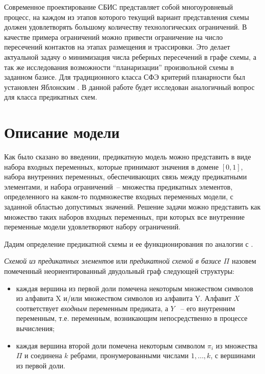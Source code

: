 \documentclass[12pt]{extarticle}
\newenvironment{definition}[1][Определение.]{\begin{trivlist}
\item[\hskip \labelsep {\bfseries #1}]}{\end{trivlist}}
\begin{document}
Современное проектирование СБИС представляет собой многоуровневый процесс, на каждом из этапов которого
текущий вариант представления схемы должен удовлетворять большому количеству технологических ограничений. 
В качестве примера ограничений можно привести ограничение на число пересечений контактов на этапах размещения и трассировки.
Это делает актуальной задачу о минимизация числа реберных пересечений в графе схемы, а так же исследования
возможности ``планаризации'' произвольной схемы в заданном базисе. Для традиционного класса СФЭ критерий планарности
был установлен Яблонским \cite{yabl_planar}. В данной работе будет исследован аналогичный вопрос для класса предикатных схем.

\clearpage
\section{Описание модели}

Как было сказано во введении, предикатную модель можно представить в виде набора входных переменных,
которые принимают значения в домене $[0, 1]$, набора внутренних переменных, 
обеспечивающих связь между предикатными элементами, и набора ограничений~-- множества
предикатных элементов, определенного на каком-то подмножестве входных переменных модели, 
с заданной областью допустимых значений.
Решение задачи можно представить как множество таких наборов входных переменных, при которых все внутренние
переменные модели удовлетворяют набору ограничений.

Дадим определение предикатной схемы и ее функционирования по аналогии с \cite{Shu11}.

\begin{definition}
\label{pred_def}
\textit{Схемой из предикатных элементов} или \textit{предикатной схемой в базисе $\Pi$} назовем помеченный
неориентированный двудольный граф следующей структуры:

\begin{itemize}
\item каждая вершина из первой доли помечена некоторым множеством символов из алфавита X и/или 
множеством символов из алфавита Y. 
Алфавит $X$ соответствует \textit{входным} переменным предиката, а $Y$ ~-- его внутренним переменным, 
т.е. переменным, возникающим непосредственно в процессе вычисления; 

\item каждая вершина второй доли помечена некоторым символом $\pi_i$ из множества $\Pi$ и 
соединена $k$ ребрами, пронумерованными числами $1, \dots, k$, с вершинами из первой доли.
\end{itemize}
\end{definition}
\end{document}
